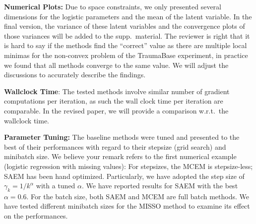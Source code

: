\documentclass{article}
\begin{document}
\textbf{Numerical Plots:} Due to space constraints, we only presented several dimensions for the logistic parameters and the mean of the latent variable. 
In the final version, the variance of these latent variables and the convergence plots of those variances will be added to the supp.~material.
The reviewer is right that it is hard to say if the methods find the ``correct'' value as there are multiple local minimas for the non-convex problem of the TraumaBase experiment, in practice we found that all methods converge to the same value. We will adjust the discussions to accurately describe the findings. \vspace{-5pt}



\textbf{Wallclock Time}:
The tested methods involve similar number of gradient computations per iteration, as such the wall clock time per iteration are comparable. In the revised paper, we will provide a comparison w.r.t.~the wallclock time.\vspace{-5pt}


\textbf{Parameter Tuning:}
The baseline methods were tuned and presented to the best of their performances with regard to their stepsize (grid search) and minibatch size.
We believe your remark refers to the first numerical example (logistic regression with missing values): For stepsizes, the MCEM is stepsize-less; SAEM has been hand optimized. Particularly, we have adopted the step size of $\gamma_k = 1/k^{\alpha}$ with a tuned $\alpha$. We have reported results for SAEM with the best $\alpha = 0.6$. For the batch size, both SAEM and MCEM are full batch methods. We have tested different minibatch sizes for the MISSO method to examine its effect on the performances.
\end{document}
